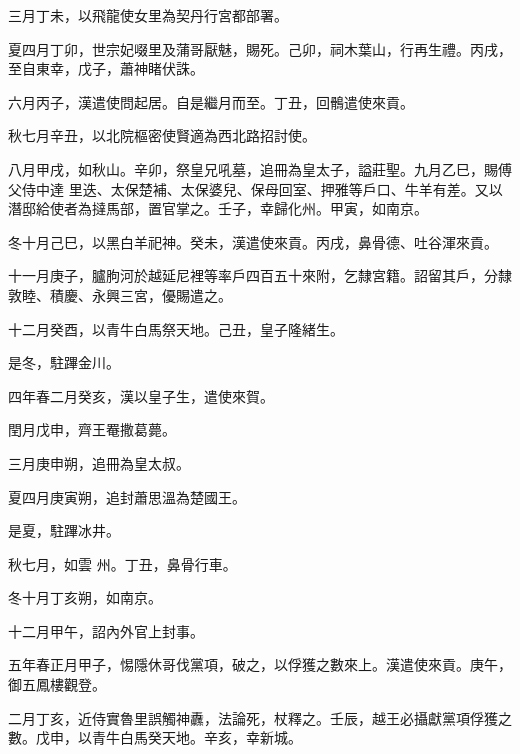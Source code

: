 \begin{pinyinscope}
 三月丁未，以飛龍使女里為契丹行宮都部署。



 夏四月丁卯，世宗妃啜里及蒲哥厭魅，賜死。己卯，祠木葉山，行再生禮。丙戌，至自東幸，戊子，蕭神睹伏誅。



 六月丙子，漢遣使問起居。自是繼月而至。丁丑，回鶻遣使來貢。



 秋七月辛丑，以北院樞密使賢適為西北路招討使。



 八月甲戌，如秋山。辛卯，祭皇兄吼墓，追冊為皇太子，謚莊聖。九月乙巳，賜傅父侍中達
 里迭、太保楚補、太保婆兒、保母回室、押雅等戶口、牛羊有差。又以潛邸給使者為撻馬部，置官掌之。壬子，幸歸化州。甲寅，如南京。



 冬十月己巳，以黑白羊祀神。癸未，漢遣使來貢。丙戌，鼻骨德、吐谷渾來貢。



 十一月庚子，臚朐河於越延尼裡等率戶四百五十來附，乞隸宮籍。詔留其戶，分隸敦睦、積慶、永興三宮，優賜遣之。



 十二月癸酉，以青牛白馬祭天地。己丑，皇子隆緒生。



 是冬，駐蹕金川。



 四年春二月癸亥，漢以皇子生，遣使來賀。



 閏月戊申，齊王罨撒葛薨。



 三月庚申朔，追冊為皇太叔。



 夏四月庚寅朔，追封蕭思溫為楚國王。



 是夏，駐蹕冰井。



 秋七月，如雲
 州。丁丑，鼻骨行車。



 冬十月丁亥朔，如南京。



 十二月甲午，詔內外官上封事。



 五年春正月甲子，惕隱休哥伐黨項，破之，以俘獲之數來上。漢遣使來貢。庚午，御五鳳樓觀登。



 二月丁亥，近侍實魯里誤觸神纛，法論死，杖釋之。壬辰，越王必攝獻黨項俘獲之數。戊申，以青牛白馬癸天地。辛亥，幸新城。




\end{pinyinscope}
